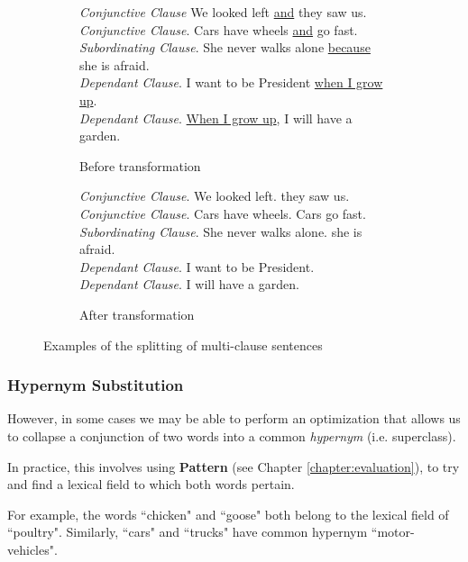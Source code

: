 \begin{figure}[H]
\begin{subfigure}{\textwidth}
\begin{displayquote}
\textit{Conjunctive Clause} We looked left \underline{and} they saw us.\\
\textit{Conjunctive Clause}. Cars have wheels \underline{and} go fast.\\
\textit{Subordinating Clause}. She never walks alone \underline{because} she is afraid.\\
\textit{Dependant Clause}. I want to be President \underline{when I grow up}.\\
\textit{Dependant Clause}. \underline{When I grow up}, I will have a garden.
\end{displayquote}
\caption{Before transformation}
\vspace{\baselineskip}
\end{subfigure}
\begin{subfigure}{\textwidth}
\begin{displayquote}
\textit{Conjunctive Clause}. We looked left. they saw us.\\
\textit{Conjunctive Clause}. Cars have wheels. Cars go fast.\\
\textit{Subordinating Clause}. She never walks alone. she is afraid.\\
\textit{Dependant Clause}. I want to be President.\\
\textit{Dependant Clause}. I will have a garden.
\caption{After transformation}
\end{displayquote}
\end{subfigure}
\caption{Examples of the splitting of multi-clause sentences}
\label{fig:clause_transformations}
\end{figure}

\subsubsection{Hypernym Substitution}

However, in some cases we may be able to perform an optimization that allows us to collapse a conjunction of two words into a common \textit{hypernym} (i.e. superclass).

In practice, this involves using \textbf{Pattern} (see Chapter \ref{chapter:evaluation}), to try and find a lexical field to which both words pertain.

For example, the words ``chicken" and ``goose" both belong to the lexical field of ``poultry". Similarly, ``cars" and ``trucks" have common hypernym ``motor-vehicles".


